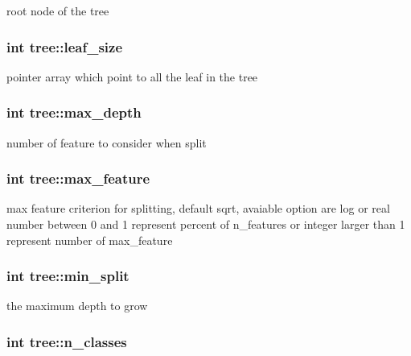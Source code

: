 root node of the tree \hypertarget{classtree_a551919e1402a700821694297623017fc}{
\subsubsection[{leaf\+\_\+size}]{\setlength{\rightskip}{0pt plus 5cm}int tree\+::leaf\+\_\+size\hspace{0.3cm}{\ttfamily [protected]}}}\label{classtree_a551919e1402a700821694297623017fc}
pointer array which point to all the leaf in the tree \hypertarget{classtree_a0a9f968fac827d3239be67488c34fb21}{
\subsubsection[{max\+\_\+depth}]{\setlength{\rightskip}{0pt plus 5cm}int tree\+::max\+\_\+depth\hspace{0.3cm}{\ttfamily [protected]}}}\label{classtree_a0a9f968fac827d3239be67488c34fb21}
number of feature to consider when split \hypertarget{classtree_a6f4304318f8f091f7d783ac1ec7d2775}{
\subsubsection[{max\+\_\+feature}]{\setlength{\rightskip}{0pt plus 5cm}int tree\+::max\+\_\+feature\hspace{0.3cm}{\ttfamily [protected]}}}\label{classtree_a6f4304318f8f091f7d783ac1ec7d2775}
max feature criterion for splitting, default {\ttfamily sqrt}, avaiable option are {\ttfamily log} or real number between 0 and 1 represent percent of {\ttfamily n\+\_\+features} or integer larger than 1 represent number of {\ttfamily max\+\_\+feature} \hypertarget{classtree_ae70cd626c0b50a0b8306a94a9e5e8fd7}{
\subsubsection[{min\+\_\+split}]{\setlength{\rightskip}{0pt plus 5cm}int tree\+::min\+\_\+split\hspace{0.3cm}{\ttfamily [protected]}}}\label{classtree_ae70cd626c0b50a0b8306a94a9e5e8fd7}
the maximum depth to grow \hypertarget{classtree_a3f074099473facb464acf152157bf4d0}{
\subsubsection[{n\+\_\+classes}]{\setlength{\rightskip}{0pt plus 5cm}int tree\+::n\+\_\+classes\hspace{0.3cm}{\ttfamily [protected]}}}\label{classtree_a3f074099473facb464acf152157bf4d0}
